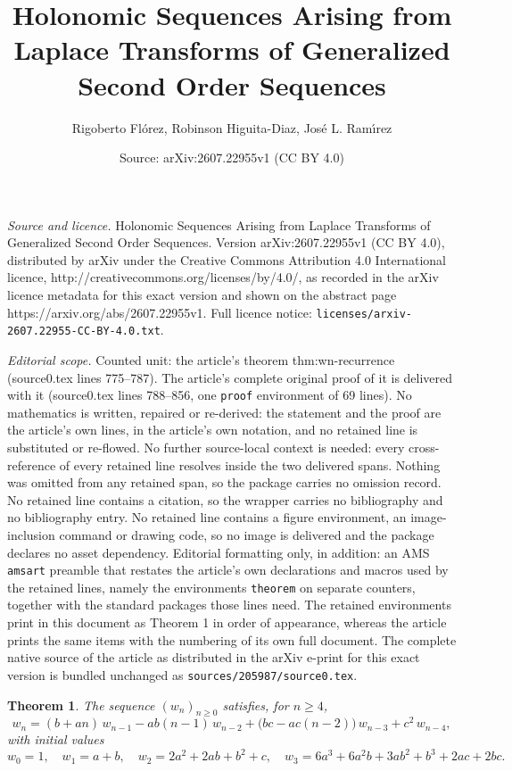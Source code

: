 \documentclass[10pt,a4paper]{amsart}
\title{Holonomic Sequences Arising from Laplace Transforms of Generalized Second Order Sequences}
\author{Rigoberto Fl\'orez, Robinson Higuita-Diaz, Jos\'e L. Ram\'{\i}rez}
\date{Source: arXiv:2607.22955v1 (CC BY 4.0)}
\newtheorem{theorem}{Theorem}
\begin{document}
\maketitle

\noindent\emph{Source and licence.} Holonomic Sequences Arising from Laplace Transforms of Generalized Second Order Sequences. Version arXiv:2607.22955v1 (CC BY 4.0), distributed by arXiv under the Creative Commons Attribution 4.0 International licence, http://creativecommons.org/licenses/by/4.0/, as recorded in the arXiv licence metadata for this exact version and shown on the abstract page https://arxiv.org/abs/2607.22955v1. Full licence notice: \texttt{licenses/arxiv-2607.22955-CC-BY-4.0.txt}.\par\smallskip

\noindent\textit{Editorial scope.} Counted unit: the article's theorem thm:wn-recurrence (source0.tex lines 775--787). The article's complete original proof of it is delivered with it (source0.tex lines 788--856, one \texttt{proof} environment of 69 lines). No mathematics is written, repaired or re-derived: the statement and the proof are the article's own lines, in the article's own notation, and no retained line is substituted or re-flowed.  No further source-local context is needed: every cross-reference of every retained line resolves inside the two delivered spans.  Nothing was omitted from any retained span, so the package carries no omission record.  No retained line contains a citation, so the wrapper carries no bibliography and no bibliography entry.  No retained line contains a figure environment, an image-inclusion command or drawing code, so no image is delivered and the package declares no asset dependency.  Editorial formatting only, in addition: an AMS \texttt{amsart} preamble that restates the article's own declarations and macros used by the retained lines, namely the environments \texttt{theorem} on separate counters, together with the standard packages those lines need.  The retained environments print in this document as Theorem 1 in order of appearance, whereas the article prints the same items with the numbering of its own full document.  The complete native source of the article as distributed in the arXiv e-print for this exact version is bundled unchanged as \texttt{sources/205987/source0.tex}.
\begin{theorem}\label{thm:wn-recurrence}
The sequence $(w_n)_{n\ge0}$ satisfies, for $n\ge 4$,
\begin{equation}\label{eq:wn-rec}
w_n=(b+an)\,w_{n-1}-ab(n-1)\,w_{n-2}+\bigl(bc-ac(n-2)\bigr)\,w_{n-3}+c^2\,w_{n-4},
\end{equation}
with initial values
\[
w_0=1,\quad 
w_1=a+b,\quad
w_2=2a^2+2ab+b^2+c,\quad
w_3=6a^3+6a^2b+3ab^2+b^3+2ac+2bc.
\]
\end{theorem}
\end{document}
